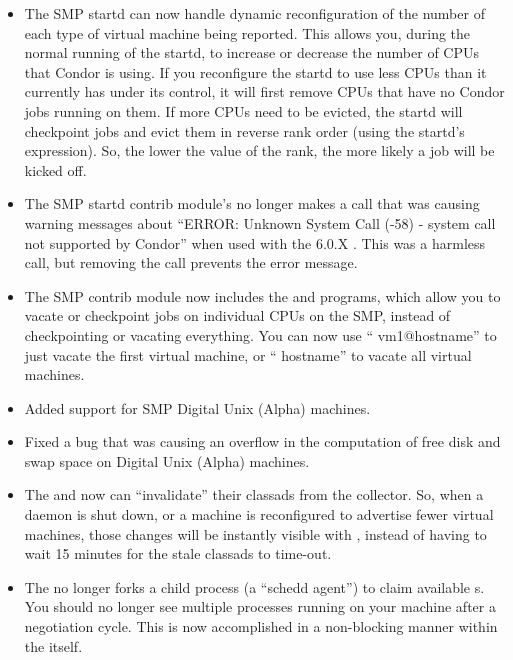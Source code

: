 \begin{itemize}
\item The SMP startd can now handle dynamic reconfiguration of the
number of each type of virtual machine being reported.
This allows you, during the normal running of the startd, to increase
or decrease the number of CPUs that Condor is using.
If you reconfigure the startd to use less CPUs than it currently has
under its control, it will first remove CPUs that have no Condor jobs
running on them.
If more CPUs need to be evicted, the startd will checkpoint jobs and
evict them in reverse rank order (using the startd's 
expression).
So, the lower the value of the rank, the more likely a job will be
kicked off.

\item The SMP startd contrib module's  no longer makes
a call that was causing warning messages about ``ERROR: Unknown System
Call (-58) - system call not supported by Condor'' when used with the
6.0.X .
This was a harmless call, but removing the call prevents the error
message.

\item The SMP contrib module now includes the  and
 programs, which allow you to vacate or checkpoint jobs
on individual CPUs on the SMP, instead of checkpointing or vacating
everything.  
You can now use `` vm1@hostname'' to just vacate the
first virtual machine, or `` hostname'' to vacate all
virtual machines. 

\item Added support for SMP Digital Unix (Alpha) machines.

\item Fixed a bug that was causing an overflow in the computation of
free disk and swap space on Digital Unix (Alpha) machines.

\item The  and  now can ``invalidate''
their classads from the collector.
So, when a daemon is shut down, or a machine is reconfigured to 
advertise fewer virtual machines, those changes will be instantly
visible with , instead of having to wait 15 minutes for
the stale classads to time-out.

\item The  no longer forks a child process (a ``schedd
agent'') to claim available s.  
You should no longer see multiple  processes running on
your machine after a negotiation cycle.
This is now accomplished in a non-blocking manner within the
 itself.


\end{itemize}
